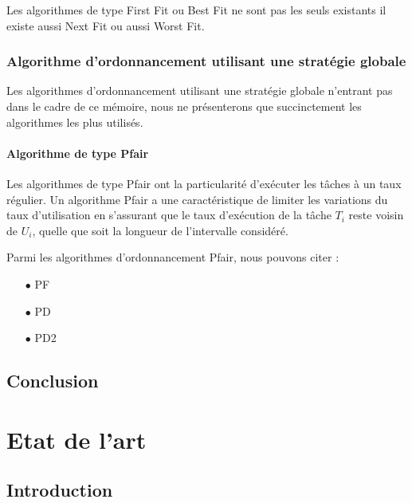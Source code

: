 Les algorithmes de type First Fit ou Best Fit ne sont pas les seuls existants il existe aussi Next Fit ou aussi Worst Fit.

\subsection{Algorithme d'ordonnancement utilisant une stratégie globale}
\vspace{-1cm}
Les algorithmes d'ordonnancement utilisant une stratégie globale n'entrant pas dans le cadre de ce mémoire, nous ne présenterons que succinctement les algorithmes les plus utilisés.
\subsubsection{Algorithme de type Pfair}
\vspace{-1cm}
Les algorithmes de type Pfair ont la particularité d'exécuter les tâches à un taux régulier. Un algorithme Pfair a une caractéristique de limiter les variations du taux d’utilisation 
en s'assurant que le taux d'exécution de la tâche $T_i$ reste voisin de $U_i$, quelle que soit la longueur de l'intervalle considéré.

Parmi les algorithmes d'ordonnancement Pfair, nous pouvons citer :
\begin{itemize}
\item[$\bullet$] PF \cite{BCPV96}
\item[$\bullet$] PD \cite{BGP95}
\item[$\bullet$] PD2 \cite{AS00}
\end{itemize}

\section{Conclusion}
\vspace{-1cm}
\chapter{Etat de l'art}
\minitoc
\section{Introduction}
